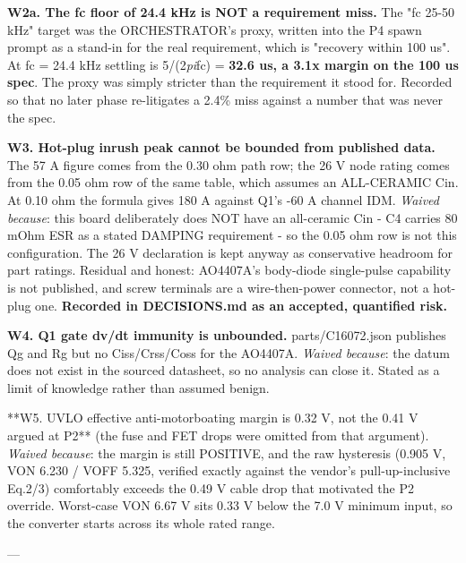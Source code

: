 \documentclass[11pt,a4paper]{article}
\begin{document}
\textbf{W2a. The fc floor of 24.4 kHz is NOT a requirement miss.} The "fc 25-50 kHz" target was the ORCHESTRATOR's proxy, written into the P4 spawn prompt as a stand-in for the real requirement, which is "recovery within 100 us". At fc = 24.4 kHz settling is 5/(2\emph{pi}fc) = \textbf{32.6 us, a 3.1x margin on the 100 us spec}. The proxy was simply stricter than the requirement it stood for. Recorded so that no later phase re-litigates a 2.4\% miss against a number that was never the spec.

\textbf{W3. Hot-plug inrush peak cannot be bounded from published data.} The 57 A figure comes from the 0.30 ohm path row; the 26 V node rating comes from the 0.05 ohm row of the same table, which assumes an ALL-CERAMIC Cin. At 0.10 ohm the formula gives 180 A against Q1's -60 A channel IDM. \emph{Waived because}: this board deliberately does NOT have an all-ceramic Cin - C4 carries 80 mOhm ESR as a stated DAMPING requirement - so the 0.05 ohm row is not this configuration. The 26 V declaration is kept anyway as conservative headroom for part ratings. Residual and honest: AO4407A's body-diode single-pulse capability is not published, and screw terminals are a wire-then-power connector, not a hot-plug one. \textbf{Recorded in DECISIONS.md as an accepted, quantified risk.}

\textbf{W4. Q1 gate dv/dt immunity is unbounded.} parts/C16072.json publishes Qg and Rg but no Ciss/Crss/Coss for the AO4407A. \emph{Waived because}: the datum does not exist in the sourced datasheet, so no analysis can close it. Stated as a limit of knowledge rather than assumed benign.

{*}{*}W5. UVLO effective anti-motorboating margin is 0.32 V, not the 0.41 V argued at P2{*}{*} (the fuse and FET drops were omitted from that argument). \emph{Waived because}: the margin is still POSITIVE, and the raw hysteresis (0.905 V, VON 6.230 / VOFF 5.325, verified exactly against the vendor's pull-up-inclusive Eq.2/3) comfortably exceeds the 0.49 V cable drop that motivated the P2 override. Worst-case VON 6.67 V sits 0.33 V below the 7.0 V minimum input, so the converter starts across its whole rated range.

---
\end{document}
